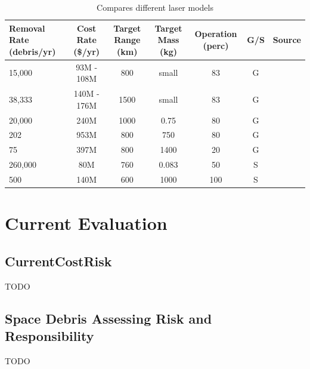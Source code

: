 \documentclass{article}
\begin{document}
\begin{table}[h]
\centering
\begin{tabular}{||p{2cm}|c|c|c|c|c|c||} \hline
 Removal Rate (debris/yr) & Cost Rate (\$/yr) & Target Range (km) & Target Mass (kg) & Operation (perc) & G/S & Source \\ %
 \hline\hline
 15,000 & 93M - 108M & 800 & small & 83 & G & \cite{ORION} \\
 38,333 & 140M - 176M & 1500 & small & 83 & G & \cite{ORION} \\
 20,000 & 240M & 1000 & 0.75 & 80 & G & \cite{PhippsSpaceLaserNow} \\ 
 202 & 953M & 800 & 750 & 80 & G & \cite{PhippsSpaceLaserNow} \\
 75 & 397M & 800 & 1400 & 20 & G & \cite{PhippsSpaceLaserNow} \\
 
 260,000 & 80M & 760 & 0.083 & 50 & S & \cite{PhippsSpaceLaserNow} \\
 500 & 140M & 600 & 1000 & 100 & S & \cite{PhippsSpaceLaserNow} \\
 
 \hline
\end{tabular}
\caption{Compares different laser models}
\label{table:Lasers}
\end{table}



\section{Current Evaluation}
\subsection{CurrentCostRisk}\cite{CurrentCostRisk}
TODO

\subsection{Space Debris Assessing Risk and Responsibility}

TODO

\clearpage



\end{document}
